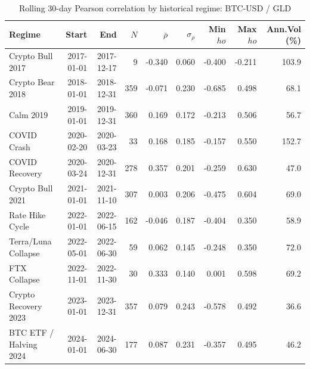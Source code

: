 \begin{table}[H]
\centering
\small
\caption{Rolling 30-day Pearson correlation by historical regime: BTC-USD / GLD}
\label{tab:regime_corr_BTCUSDGLD}
\begin{tabular}{lrrrrrrrr}
\toprule
Regime & Start & End & $N$ & $\bar{\rho}$ & $\sigma_\rho$ & Min $
ho$ & Max $
ho$ & Ann.Vol (\%) \\
\midrule
Crypto Bull 2017 & 2017-01-01 & 2017-12-17 & 9 & -0.340 & 0.060 & -0.400 & -0.211 & 103.9 \\
Crypto Bear 2018 & 2018-01-01 & 2018-12-31 & 359 & -0.071 & 0.230 & -0.685 & 0.498 & 68.1 \\
Calm 2019 & 2019-01-01 & 2019-12-31 & 360 & 0.169 & 0.172 & -0.213 & 0.506 & 56.7 \\
COVID Crash & 2020-02-20 & 2020-03-23 & 33 & 0.168 & 0.185 & -0.157 & 0.550 & 152.7 \\
COVID Recovery & 2020-03-24 & 2020-12-31 & 278 & 0.357 & 0.201 & -0.259 & 0.630 & 47.0 \\
Crypto Bull 2021 & 2021-01-01 & 2021-11-10 & 307 & 0.003 & 0.206 & -0.475 & 0.604 & 69.0 \\
Rate Hike Cycle & 2022-01-01 & 2022-06-15 & 162 & -0.046 & 0.187 & -0.404 & 0.350 & 58.9 \\
Terra/Luna Collapse & 2022-05-01 & 2022-06-30 & 59 & 0.062 & 0.145 & -0.248 & 0.350 & 72.0 \\
FTX Collapse & 2022-11-01 & 2022-11-30 & 30 & 0.333 & 0.140 & 0.001 & 0.598 & 69.2 \\
Crypto Recovery 2023 & 2023-01-01 & 2023-12-31 & 357 & 0.079 & 0.243 & -0.578 & 0.492 & 36.6 \\
BTC ETF / Halving 2024 & 2024-01-01 & 2024-06-30 & 177 & 0.087 & 0.231 & -0.357 & 0.495 & 46.2 \\
\bottomrule
\end{tabular}
\end{table}